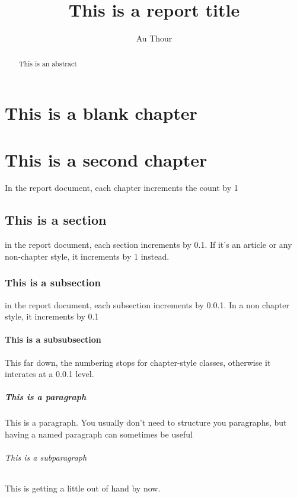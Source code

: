 \documentclass[a4paper]{report}
\author{Au Thour}
\title{This is a report title}
\begin{document}
\maketitle

\begin{abstract}
This is an abstract
\end{abstract}

\chapter{This is a blank chapter}

\chapter{This is a second chapter}
In the report document, each chapter increments the count by 1

\section{This is a section}
in the report document, each section increments by 0.1. If it's an article or any non-chapter style, it increments by 1 instead.

\subsection{This is a subsection}
in the report document, each subsection increments by 0.0.1. In a non chapter style, it increments by 0.1

\subsubsection{This is a subsubsection}
This far down, the numbering stops for chapter-style classes, otherwise it interates at a 0.0.1 level.

\paragraph{This is a paragraph}
This is a paragraph. You usually don't need to structure you paragraphs, but having a named paragraph can sometimes be useful

\subparagraph{This is a subparagraph}
This is getting a little out of hand by now.
\end{document}
